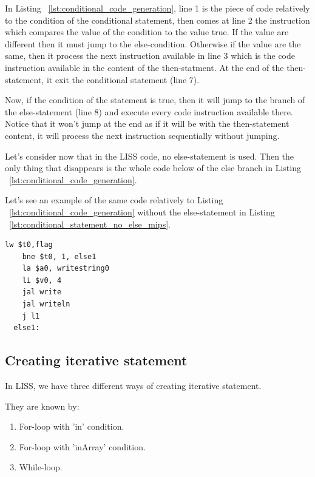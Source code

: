 \documentclass[
  oneside,
  11pt, a4paper,
  footinclude=true,
  headinclude=true,
  cleardoublepage=empty
]{scrbook}
\begin{document}
In Listing ~\ref{lst:conditional_code_generation}, line 1 is the piece of code relatively to the condition of the conditional statement, then comes at line 2 the instruction which compares the value of the condition to the value true. If the value are different then it must jump to the else-condition. Otherwise if the value are the same, then it process the next instruction available in line 3 which is the code instruction available in the content of the then-statment. At the end of the then-statement, it exit the conditional statement (line 7).

Now, if the condition of the statement is true, then it will jump to the branch of the else-statement (line 8) and execute every code instruction available there. Notice that it won't jump at the end as if it will be with the then-statement content, it will process the next instruction sequentially without jumping.

Let's consider now that in the LISS code, no else-statement is used. Then the only thing that disappears is the whole code below of the else branch in Listing ~\ref{lst:conditional_code_generation}.

Let's see an example of the same code relatively to Listing ~\ref{lst:conditional_code_generation} without the else-statement in Listing ~\ref{lst:conditional_statement_no_else_mips}.

\begin{lstlisting}[caption={Code generated for conditional statements without an else-statement in MIPS},label={lst:conditional_statement_no_else_mips}]
    lw $t0,flag		
    bne $t0, 1, else1		
    la $a0, writestring0
    li $v0, 4
    jal write		
    jal writeln		
    j l1		
  else1:
\end{lstlisting}

\subsection{Creating iterative statement}

In LISS, we have three different ways of creating iterative statement. 

They are known by:

\begin{enumerate}
\item For-loop with 'in' condition.
\item For-loop with 'inArray' condition.
\item While-loop.
\end{enumerate}
\end{document}
